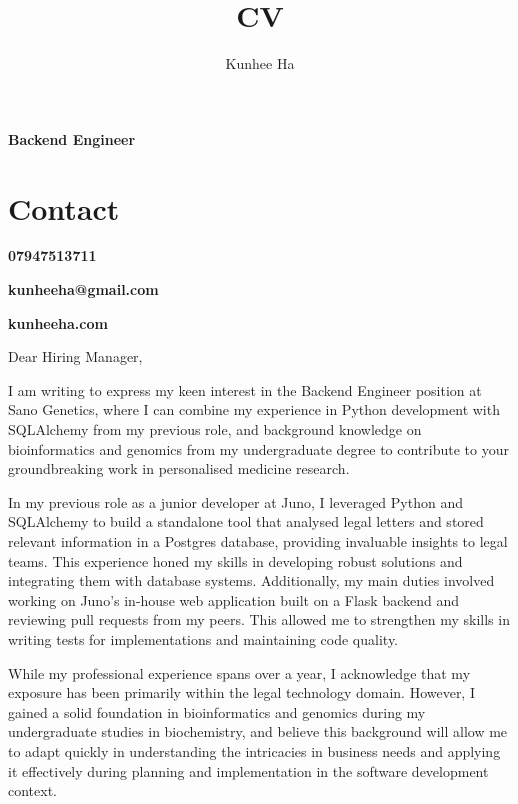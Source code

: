 \documentclass{article}
\renewcommand{\maketitle}{
  {\noindent\rmfamily\huge\bfseries\MakeUppercase\theauthor}

  {\color{black}\rmfamily\normalsize\bfseries{Backend Engineer}}
}
\newcommand{\contacts}[3]{
  {
    {\noindent\rmfamily\small\color{BodyGrey}\bfseries{\color{LightGrey}\faPhone}\hspace{3pt}#1}

    {\noindent\rmfamily\small\color{BodyGrey}\bfseries{\color{LightGrey}\faEnvelope}\hspace{3pt}#2}

    {\noindent\rmfamily\small\color{BodyGrey}\bfseries{\color{LightGrey}\faLink}\hspace{3pt}#3}

  }
}
\begin{document}
  \title{CV}
  \author{Kunhee Ha}
\begin{paracol}{2}
  \raggedright
  \maketitle

\section{Contact}

\contacts
  {07947513711}
  {kunheeha@gmail.com}
  {kunheeha.com}

  \switchcolumn
  \vspace{3pt}
\color{BodyGrey}
Dear Hiring Manager,
\vspace{15pt}

I am writing to express my keen interest in the Backend Engineer position at Sano Genetics, where I can combine my experience in Python development with SQLAlchemy from my previous role, and background knowledge on bioinformatics and genomics from my undergraduate degree to contribute to your groundbreaking work in personalised medicine research. 
\vspace{15pt}


In my previous role as a junior developer at Juno, I leveraged Python and SQLAlchemy to build a standalone tool that analysed legal letters and stored relevant information in a Postgres database, providing invaluable insights to legal teams. This experience honed my skills in developing robust solutions and integrating them with database systems. Additionally, my main duties involved working on Juno's in-house web application built on a Flask backend and reviewing pull requests from my peers. This allowed me to strengthen my skills in writing tests for implementations and maintaining code quality.
\vspace{15pt}


While my professional experience spans over a year, I acknowledge that my exposure has been primarily within the legal technology domain. However, I gained a solid foundation in bioinformatics and genomics during my undergraduate studies in biochemistry, and believe this background will allow me to adapt quickly in understanding the intricacies in business needs and applying it effectively during planning and implementation in the software development context.
\vspace{15pt}



\end{paracol}
\end{document}
